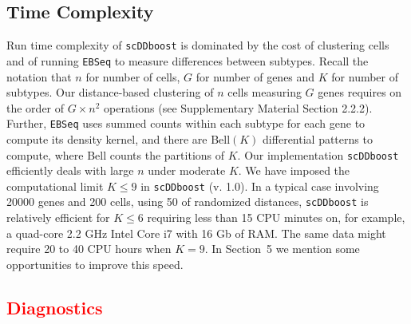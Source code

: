 \documentclass[aoas,preprint]{imsart}
\begin{document}
\subsection{Time Complexity}

Run time complexity of \texttt{scDDboost} is dominated by the cost of clustering cells and of running \texttt{EBSeq} to measure differences between subtypes. 
Recall the notation that $n$ for number of cells, $G$ for number of genes and $K$ for number of subtypes. 
Our distance-based clustering of  $n$ cells measuring $G$ genes requires on the order of $G \times n^2$ operations (see Supplementary Material Section 2.2.2).
Further, \texttt{EBSeq} uses summed counts within each subtype for each gene to compute its density kernel, and there are Bell$(K)$ differential patterns to compute,
where Bell counts the partitions of $K$.  
Our implementation \texttt{scDDboost} efficiently deals with large $n$ under moderate $K$.  We have imposed the computational limit  $K \leq 9$ in
 \verb+scDDboost+ (v. 1.0).  In a typical case involving 20000 genes and 200 cells,
 using 50 of randomized distances, \verb+scDDboost+  is relatively efficient for $K \leq 6$ requiring
 less than 15 CPU minutes on, for example, a quad-core 2.2 GHz Intel Core i7 with 16 Gb of RAM.
 The same data might require 20 to 40 CPU hours when $K=9$.  In Section~5 we mention some opportunities to improve this speed.

\subsection{\textcolor{red}{Diagnostics}}


\end{document}
